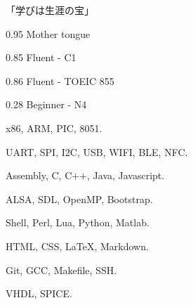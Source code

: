\documentclass[a4paper]{article}
\begin{document}
\begin{column}[\rightcolumnwidth]


		\addcontent
		{
			{\Large\begin{CJK}{UTF8}{min}「学びは生涯の宝」\end{CJK}}
		}{}{}{}{}


		{}{}{}{}

		{}{}{}{}

		{}{}{}{}

		{}{}{}{}

		{}{}{}{}


			{0.95}
			{Mother tongue}
			{}{}{}

			{0.85}
			{Fluent - C1}
			{}{}{}

			{0.86}
			{Fluent - TOEIC 855}
			{}{}{}

			{0.28}
			{Beginner - N4}
			{}{}{}


			{x86, ARM, PIC, 8051.}
			{}{}{}{}

			{UART, SPI, I2C, USB, WIFI, BLE, NFC.}
			{}{}{}{}

			{Assembly, C, C++, Java, Javascript.}
			{}{}{}{}

			{ALSA, SDL, OpenMP, Bootstrap.}
			{}{}{}{}

			{Shell, Perl, Lua, Python, Matlab.}
			{}{}{}{}

			{HTML, CSS, {\LaTeX}, Markdown.}
			{}{}{}{}

			{Git, GCC, Makefile, SSH.}
			{}{}{}{}

			{VHDL, SPICE.}
			{}{}{}{}



\end{column}
\end{document}

